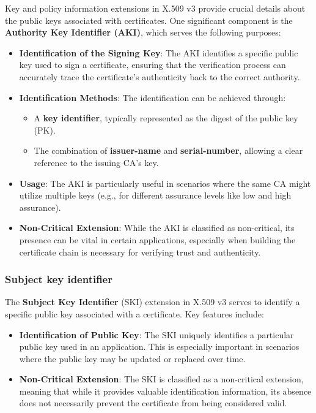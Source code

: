 Key and policy information extensions in X.509 v3 provide crucial
details about the public keys associated with certificates. One
significant component is the \textbf{Authority Key Identifier (AKI)},
which serves the following purposes:

\begin{itemize}
  \item \textbf{Identification of the Signing Key}: The AKI
    identifies a specific public key used to sign a certificate,
    ensuring that the verification process can accurately trace the
    certificate's authenticity back to the correct authority.

  \item \textbf{Identification Methods}: The identification can be
    achieved through:
    \begin{itemize}
      \item A \textbf{key identifier}, typically represented as the
        digest of the public key (PK).
      \item The combination of \textbf{issuer-name} and
        \textbf{serial-number}, allowing a clear reference to the
        issuing CA's key.
    \end{itemize}

  \item \textbf{Usage}: The AKI is particularly useful in scenarios
    where the same CA might utilize multiple keys (e.g., for
    different assurance levels like low and high assurance).

  \item \textbf{Non-Critical Extension}: While the AKI is classified
    as non-critical, its presence can be vital in certain
    applications, especially when building the certificate chain is
    necessary for verifying trust and authenticity.
\end{itemize}

\subsubsection{Subject key identifier}
The \textbf{Subject Key Identifier} (SKI) extension in X.509 v3 serves
to identify a specific public key associated with a certificate. Key
features include:

\begin{itemize}
  \item \textbf{Identification of Public Key}: The SKI uniquely
    identifies a particular public key used in an application. This
    is especially important in scenarios where the public key may be
    updated or replaced over time.

  \item \textbf{Non-Critical Extension}: The SKI is classified as a
    non-critical extension, meaning that while it provides valuable
    identification information, its absence does not necessarily
    prevent the certificate from being considered valid.
\end{itemize}
